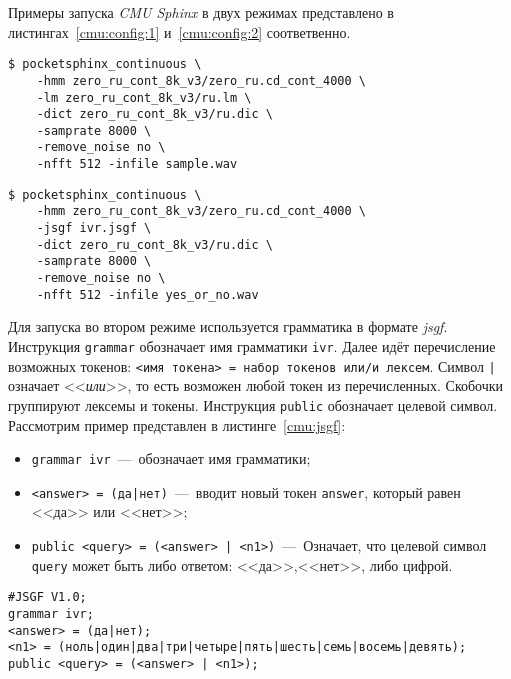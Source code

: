 Примеры запуска \textit{CMU Sphinx} в двух режимах представлено в
листингах~\ref{cmu:config:1} и~\ref{cmu:config:2} соответвенно.

\begin{lstlisting}[caption={Запуск \textit{CMU Sphinx}. Вариант 1},label={cmu:config:1}]
$ pocketsphinx_continuous \
    -hmm zero_ru_cont_8k_v3/zero_ru.cd_cont_4000 \
    -lm zero_ru_cont_8k_v3/ru.lm \
    -dict zero_ru_cont_8k_v3/ru.dic \
    -samprate 8000 \
    -remove_noise no \
    -nfft 512 -infile sample.wav
\end{lstlisting}

\begin{lstlisting}[caption={Запуск \textit{CMU Sphinx}. Вариант 2},label={cmu:config:2}]
$ pocketsphinx_continuous \
    -hmm zero_ru_cont_8k_v3/zero_ru.cd_cont_4000 \
    -jsgf ivr.jsgf \
    -dict zero_ru_cont_8k_v3/ru.dic \
    -samprate 8000 \
    -remove_noise no \
    -nfft 512 -infile yes_or_no.wav
\end{lstlisting}

Для запуска во втором режиме используется грамматика в формате \textit{jsgf}.
Инструкция \texttt{grammar} обозначает имя грамматики \texttt{ivr}. Далее
идёт перечисление возможных токенов: \texttt{<имя токена> = набор токенов или/и лексем}.
Символ \texttt{|} означает <<\textit{или}>>, то есть возможен любой токен из перечисленных.
Скобочки группируют лексемы и токены. Инструкция \texttt{public} обозначает целевой символ.
Рассмотрим пример представлен в листинге~\ref{cmu:jsgf}:

\begin{itemize}
    \item \texttt{grammar ivr}~---~обозначает имя грамматики;
    \item \texttt{<answer> = (да|нет)}~---~вводит новый токен \texttt{answer},
    который равен <<да>> или <<нет>>;
    \item \texttt{public <query> = (<answer> | <n1>)}~---~Означает, что целевой
        символ \texttt{query} может быть либо ответом: <<да>>,<<нет>>, либо цифрой.
\end{itemize}

{
\captionof{lstlisting}{Пример грамматики}\label{cmu:jsgf}
\vspace{-10pt}
\begin{Verbatim}[fontsize=\footnotesize,xleftmargin=15mm]
#JSGF V1.0;
grammar ivr;
<answer> = (да|нет);
<n1> = (ноль|один|два|три|четыре|пять|шесть|семь|восемь|девять);
public <query> = (<answer> | <n1>);
\end{Verbatim}
}

